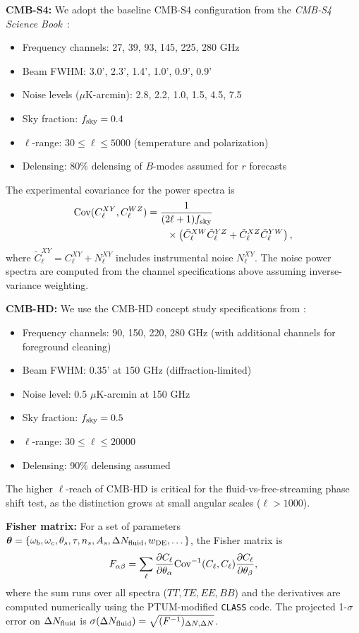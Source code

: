 \documentclass[epj]{svjour}
\begin{document}
\textbf{CMB-S4:} We adopt the baseline CMB-S4 configuration from
the \textit{CMB-S4 Science Book}~\cite{Abazajian2016}:
\begin{itemize}
\item Frequency channels: 27, 39, 93, 145, 225, 280 GHz
\item Beam FWHM: 3.0', 2.3', 1.4', 1.0', 0.9', 0.9'
\item Noise levels (\(\mu\)K-arcmin): 2.8, 2.2, 1.0, 1.5, 4.5, 7.5
\item Sky fraction: \(f_{\rm sky} = 0.4\)
\item \(\ell\)-range: \(30 \le \ell \le 5000\) (temperature and polarization)
\item Delensing: 80\% delensing of \(B\)-modes assumed for \(r\) forecasts
\end{itemize}
The experimental covariance for the power spectra is
\begin{equation}
\begin{split}
{\rm Cov}(C_\ell^{XY}, C_\ell^{WZ})
&= \frac{1}{(2\ell+1)f_{\rm sky}} \\
&\qquad \times \left(\tilde C_\ell^{XW}\tilde C_\ell^{YZ}
+ \tilde C_\ell^{XZ}\tilde C_\ell^{YW}\right),
\end{split}
\end{equation}
where \(\tilde C_\ell^{XY} = C_\ell^{XY} + N_\ell^{XY}\) includes
instrumental noise \(N_\ell^{XY}\). The noise power spectra are
computed from the channel specifications above assuming
inverse-variance weighting.

\textbf{CMB-HD:} We use the CMB-HD concept study specifications
from \cite{Sehgal2019}:
\begin{itemize}
\item Frequency channels: 90, 150, 220, 280 GHz (with additional
      channels for foreground cleaning)
\item Beam FWHM: 0.35' at 150 GHz (diffraction-limited)
\item Noise level: 0.5 \(\mu\)K-arcmin at 150 GHz
\item Sky fraction: \(f_{\rm sky} = 0.5\)
\item \(\ell\)-range: \(30 \le \ell \le 20000\)
\item Delensing: 90\% delensing assumed
\end{itemize}
The higher \(\ell\)-reach of CMB-HD is critical for the
fluid-vs-free-streaming phase shift test, as the distinction
grows at small angular scales (\(\ell > 1000\)).

\textbf{Fisher matrix:} For a set of parameters
\(\boldsymbol{\theta} = \{\omega_b, \omega_c, \theta_s, \tau, n_s,
A_s, \Delta N_{\rm fluid}, w_{\rm DE}, \dots\}\), the Fisher matrix
is
\begin{equation}
F_{\alpha\beta} = \sum_\ell \frac{\partial C_\ell}{\partial\theta_\alpha}
{\rm Cov}^{-1}(C_\ell, C_\ell)
\frac{\partial C_\ell}{\partial\theta_\beta},
\end{equation}
where the sum runs over all spectra (\(TT, TE, EE, BB\)) and the
derivatives are computed numerically using the PTUM-modified
\texttt{CLASS} code. The projected 1-\(\sigma\) error on
\(\Delta N_{\rm fluid}\) is \(\sigma(\Delta N_{\rm fluid}) =
\sqrt{(F^{-1})_{\Delta N,\Delta N}}\).
\end{document}
